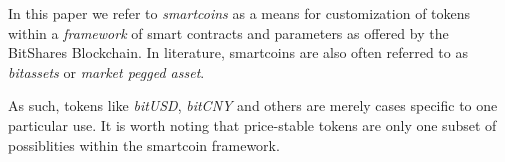 In this paper we refer to \emph{smartcoins} as a means for customization of
tokens within a \emph{framework} of smart contracts and parameters as offered
by the BitShares Blockchain. In literature, smartcoins are also often referred
to as \emph{bitassets} or \emph{market pegged asset}.

As such, tokens like \emph{bitUSD}, \emph{bitCNY} and others are merely
cases specific to one particular use. It is worth noting that
price-stable tokens are only one subset of possiblities within the
smartcoin framework.
